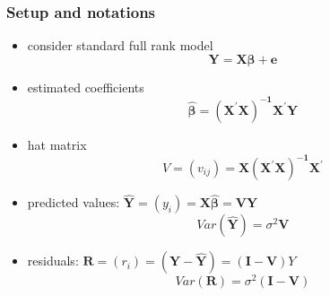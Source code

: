 \documentclass[
	11pt, %
]{beamer}
\begin{document}
\begin{frame}[allowframebreaks]
	\frametitle{Setup and notations}
	\begin{itemize}
		
		\item consider standard full rank model
		\begin{equation*}
			\mathbf{Y}=\mathbf{X\beta}+\mathbf{e}
		\end{equation*}
		\item estimated coefficients
		\begin{equation*}
			\mathbf{\hat{\beta}}=\mathbf{(X^{'}X)^{-1}X^{'}Y}
		\end{equation*}
		\item hat matrix
		\begin{equation*}
			V=(v_{ij})=\mathbf{X(X^{'}X)^{-1}X^{'}}
		\end{equation*}
		\item predicted values: $\mathbf{\hat{Y}}=(y_i)=\mathbf{X\hat{\beta}}=\mathbf{VY}$
		\begin{equation*}
			Var(\mathbf{\hat{Y}})=\sigma^2\mathbf{V}
		\end{equation*}
		\item residuals: $\mathbf{R}=(r_i)=(\mathbf{Y-\hat{Y}})=(\mathbf{I-V})Y$
		\begin{equation*}
			Var(\mathbf{R})=\sigma^2(\mathbf{I-V})
		\end{equation*}
		\end{itemize}
\end{frame}
\end{document}
